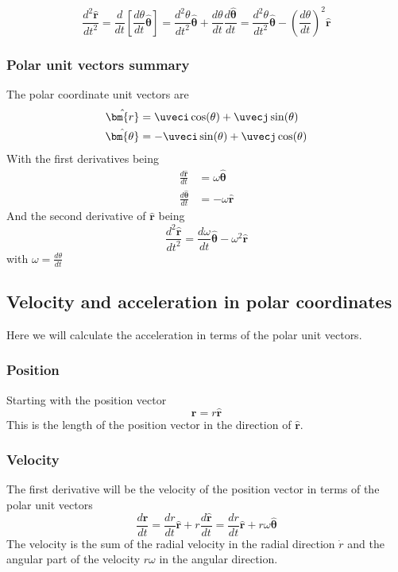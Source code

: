 \begin{equation} \label{eq:radaccel}
\frac{d^2 {\hat{\bm{r}}}}{d t^2} = \frac{d}{dt}\left[ \frac{ d \theta}{d t} \hat{\bm{\theta}} \right]=\frac{d^2 \theta}{d t^2}\hat{\bm{\theta}}+\frac{d \theta}{d t} \frac{d \hat{\bm{\theta}}}{dt}=\frac{d^2 \theta}{d t^2}\hat{\bm{\theta}}-\left(\frac{d \theta}{d t} \right)^2  \hat{\bm{r}} 
\end{equation}

\begin{framed}
\subsubsection*{Polar unit vectors summary}
The polar coordinate unit vectors are
\begin{align*}
\hat{\bm{r}} &= \uveci \cos( \theta ) + \uvecj \sin( \theta ) \\
\hat{\bm{\theta}}  &= - \uveci \sin( \theta ) + \uvecj \cos( \theta )
\end{align*}
With the first derivatives being
\begin{align*}
\frac{d {\hat{\bm{r}}}}{d t} &=  \omega \hat{\bm{\theta}} \\
\frac{d {\hat{\bm{\theta}}}}{d t} &=-\omega \hat{\bm{r}}
\end{align*}
And the second derivative of $\hat{\bm{r}}$ being
\begin{equation*}
\frac{d^2 {\hat{\bm{r}}}}{d t^2} =\frac{d \omega}{d t}\hat{\bm{\theta}}-\omega^2  \hat{\bm{r}} 
\end{equation*}
with $\omega = \frac{d \theta}{d t}$
\end{framed}

\subsection{Velocity and acceleration in polar coordinates}
Here we will calculate the acceleration in terms of the polar unit vectors. 

\subsubsection{Position}
Starting with the position vector
\begin{equation}
\textbf{r}= r \hat{\textbf{r}}
\end{equation}
This is the length of the position vector in the direction of $\hat{\bm{r}}$.

\subsubsection{Velocity}
The first derivative will be the velocity of the position vector in terms of the polar unit vectors
\begin{equation}\label{eq:vel}
\frac{d \bm{r}}{d t} = \frac{d r}{d t} \hat{\bm{r}} + r \frac{d \hat{\bm{r}}}{d t}=\frac{d r}{d t} \hat{\bm{r}} + r \omega \hat{\bm{\theta}}
\end{equation}
The velocity is the sum of the radial velocity in the radial direction $\dot{r}$ and the angular part of the velocity $r \omega$ in the angular direction.

